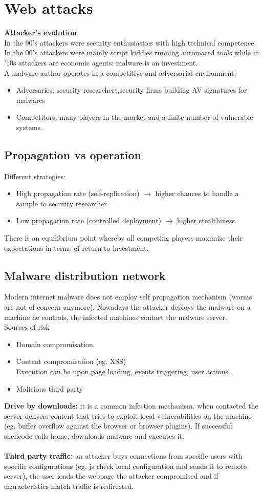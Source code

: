 \documentclass[10pt,a4paper]{book}
\begin{document}
\chapter{Web attacks}
\textbf{Attacker's evolution}\\
In the 90's attackers were security enthusiastics with high technical competence. In the 00's attackers were mainly script kiddies running automated tools while in '10s attackers are economic agents: malware is an investment.\\
A malware author operates in a competitive and adversarial environment:
\begin{itemize}
\item Adversaries: security researchers,security firms building AV signatures for malwares
\item Competitors: many players in the market and a finite number of vulnerable systems.
\end{itemize}
\section{Propagation vs operation}
Different strategies:
\begin{itemize}
\item High propagation rate (self-replication) $\to$  higher chances to handle a sample to security researcher
\item Low propagation rate (controlled deployment) $\to$ higher stealthiness
\end{itemize}
There is an equilibrium point whereby all competing players maximize their expectations in terms of return to investment.\\
\section{Malware distribution network}
Modern internet malware does not employ self propagation mechanism (worms are not of concern anymore).
Nowadays the attacker deploys the malware on a machine he controls, the infected machines contact the malware server.\\
Sources of risk
\begin{itemize}
\item Domain compromisation
\item Content compromisation (eg. XSS)\\
Execution can be upon page loading, events triggering, user actions.
\item Malicious third party
\end{itemize}
\textbf{Drive by downloads:} it is a common infection mechanism. when contacted the server delivers content that tries to exploit local vulnerabilities on the machine (eg. buffer overflow against the browser or browser plugins). If successful shellcode calls home, downloads malware and executes it.\\\\
\textbf{Third party traffic:} an attacker buys connections from specific users with specific configurations (eg. js check local configuration and sends it to remote server), the user loads the webpage the attacker compromised and if characteristics match traffic is redirected.
\end{document}
